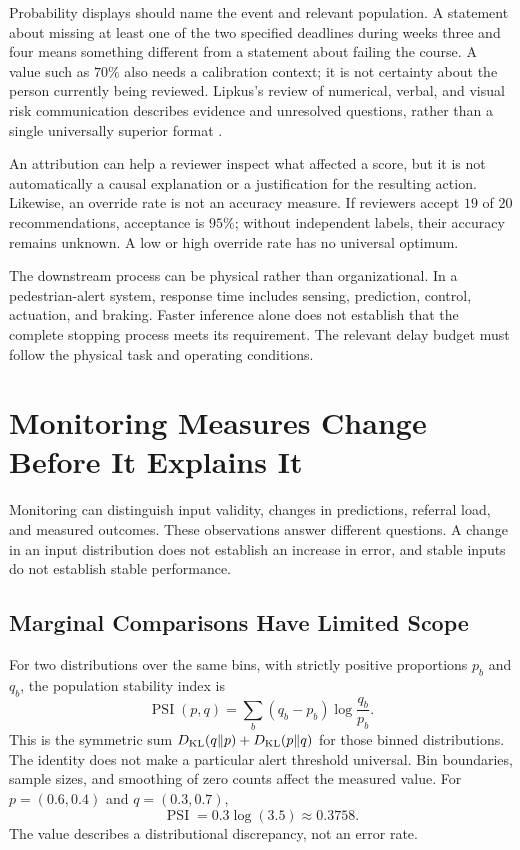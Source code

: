 Probability displays should name the event and relevant population. A statement about missing at least one of the two specified deadlines during weeks three and four means something different from a statement about failing the course. A value such as $70\%$ also needs a calibration context; it is not certainty about the person currently being reviewed. Lipkus's review of numerical, verbal, and visual risk communication describes evidence and unresolved questions, rather than a single universally superior format \citep{lipkus2007}.

An attribution can help a reviewer inspect what affected a score, but it is not automatically a causal explanation or a justification for the resulting action. Likewise, an override rate is not an accuracy measure. If reviewers accept $19$ of $20$ recommendations, acceptance is $95\%$; without independent labels, their accuracy remains unknown. A low or high override rate has no universal optimum.

The downstream process can be physical rather than organizational. In a pedestrian-alert system, response time includes sensing, prediction, control, actuation, and braking. Faster inference alone does not establish that the complete stopping process meets its requirement. The relevant delay budget must follow the physical task and operating conditions.

\section{Monitoring Measures Change Before It Explains It}

Monitoring can distinguish input validity, changes in predictions, referral load, and measured outcomes. These observations answer different questions. A change in an input distribution does not establish an increase in error, and stable inputs do not establish stable performance.

\subsection{Marginal Comparisons Have Limited Scope}

For two distributions over the same bins, with strictly positive proportions $p_b$ and $q_b$, the population stability index is
\[
\operatorname{PSI}(p,q)=
\sum_b(q_b-p_b)\log\frac{q_b}{p_b}.
\]
This is the symmetric sum $D_{\rm KL}(q\|p)+D_{\rm KL}(p\|q)$ for those binned distributions. The identity does not make a particular alert threshold universal. Bin boundaries, sample sizes, and smoothing of zero counts affect the measured value. For $p=(0.6,0.4)$ and $q=(0.3,0.7)$,
\[
\operatorname{PSI}=0.3\log(3.5)\approx0.3758.
\]
The value describes a distributional discrepancy, not an error rate.


